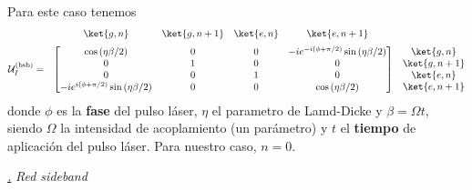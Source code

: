 \documentclass[a4paper,11pt]{article} %
\def\lp{\left(}
\def\rp{\right)}
\def\subsubiContadorIt{\par\addtocounter{subsubsection}{1}\underline{\it\thesubsubsection.}\hskip0.5cm \setcounter{subsubsubsectionIt}{0}}
\newcommand{\SubsubiIt}[1]{
		\subsubiContadorIt \textit{#1}
	}
\newcounter{subsubsubsectionIt}[subsubsection]
\begin{document}
Para este caso tenemos 
\begin{equation*} \label{ec_ions_U_bsb}
 \begin{matrix}
    & 
    \begin{matrix}
      \makebox[\widthof{$-i e^{i (\phi + \pi/2)} \sin \lp \eta\beta/2 \rp$}]{$\ket{g,n}$}   & 
      \ket{g,n+1} & 
      \ket{e,n}   &
      \makebox[\widthof{$-i e^{-i (\phi+ \pi/2)} \sin \lp \eta\beta/2 \rp$}]{$\ket{e,n+1}$} 
    \end{matrix} 	&  \\[.5\normalbaselineskip]
    \mathcal{U}_I^{(\text{bsb})} = & 
    \begin{bmatrix}
        \cos \lp \eta\beta/2 \rp  & 
        \makebox[\widthof{$\ket{g,n+1}$}]{$0$}   & 
        \makebox[\widthof{$\ket{e,n}$}]{$0$}  & 
        -i e^{-i (\phi+ \pi/2)} \sin \lp \eta\beta/2 \rp    \\
        0   & 
        \makebox[\widthof{$\ket{g,n+1}$}]{$1$}   & 
        0 & 
        0 \\
        0 & 
        \makebox[\widthof{$\ket{g,n+1}$}]{$0$}   & 
        \makebox[\widthof{$\ket{e,n}$}]{$1$} & 
        0 \\
        -i e^{i (\phi+ \pi/2)} \sin \lp \eta\beta/2 \rp  & 
        \makebox[\widthof{$\ket{g,n+1}$}]{$0$}   & 
        \makebox[\widthof{$\ket{e,n}$}]{$0$} & 
        \cos \lp \eta\beta/2 \rp  
    \end{bmatrix} &
    \begin{matrix} \ket{g,n} \\ \ket{g,n+1} \\ \ket{e,n} \\ \ket{e,n+1} \end{matrix} 
\end{matrix}
\end{equation*}
donde $\phi$ es la \textbf{fase} del pulso láser, $\eta$ el parametro de Lamd-Dicke y $\beta = \Omega t$, siendo $\Omega$ la intensidad de acoplamiento (un parámetro) y $t$ el \textbf{tiempo} de aplicación del pulso láser. Para nuestro caso, $n = 0$.

		\SubsubiIt{Red sideband}
\end{document}
